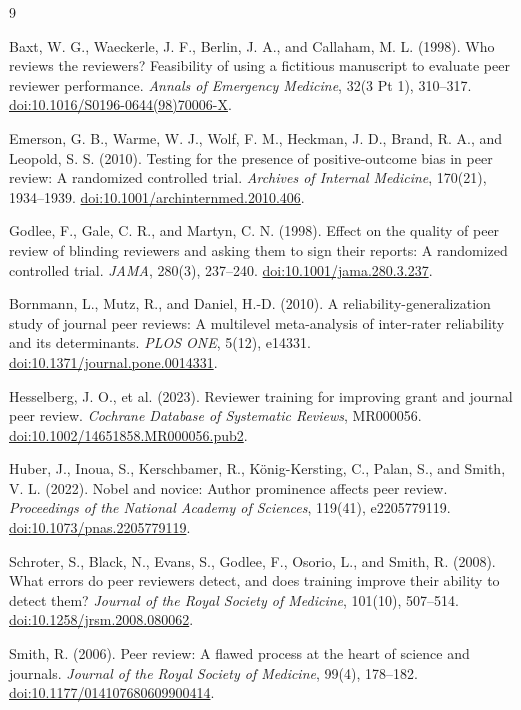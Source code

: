 \begin{thebibliography}{9}


Baxt, W. G., Waeckerle, J. F., Berlin, J. A., and Callaham, M. L. (1998).
Who reviews the reviewers? Feasibility of using a fictitious manuscript to evaluate peer reviewer performance.
\textit{Annals of Emergency Medicine}, 32(3 Pt 1), 310--317.
\href{https://doi.org/10.1016/S0196-0644(98)70006-X}{doi:10.1016/S0196-0644(98)70006-X}.

Emerson, G. B., Warme, W. J., Wolf, F. M., Heckman, J. D., Brand, R. A., and Leopold, S. S. (2010).
Testing for the presence of positive-outcome bias in peer review: A randomized controlled trial.
\textit{Archives of Internal Medicine}, 170(21), 1934--1939.
\href{https://doi.org/10.1001/archinternmed.2010.406}{doi:10.1001/archinternmed.2010.406}.

Godlee, F., Gale, C. R., and Martyn, C. N. (1998).
Effect on the quality of peer review of blinding reviewers and asking them to sign their reports: A randomized controlled trial.
\textit{JAMA}, 280(3), 237--240.
\href{https://doi.org/10.1001/jama.280.3.237}{doi:10.1001/jama.280.3.237}.

Bornmann, L., Mutz, R., and Daniel, H.-D. (2010).
A reliability-generalization study of journal peer reviews: A multilevel meta-analysis of inter-rater reliability and its determinants.
\textit{PLOS ONE}, 5(12), e14331.
\href{https://doi.org/10.1371/journal.pone.0014331}{doi:10.1371/journal.pone.0014331}.

Hesselberg, J. O., et al. (2023).
Reviewer training for improving grant and journal peer review.
\textit{Cochrane Database of Systematic Reviews}, MR000056.
\href{https://doi.org/10.1002/14651858.MR000056.pub2}{doi:10.1002/14651858.MR000056.pub2}.

Huber, J., Inoua, S., Kerschbamer, R., K{\"o}nig-Kersting, C., Palan, S., and Smith, V. L. (2022).
Nobel and novice: Author prominence affects peer review.
\textit{Proceedings of the National Academy of Sciences}, 119(41), e2205779119.
\href{https://doi.org/10.1073/pnas.2205779119}{doi:10.1073/pnas.2205779119}.

Schroter, S., Black, N., Evans, S., Godlee, F., Osorio, L., and Smith, R. (2008).
What errors do peer reviewers detect, and does training improve their ability to detect them?
\textit{Journal of the Royal Society of Medicine}, 101(10), 507--514.
\href{https://doi.org/10.1258/jrsm.2008.080062}{doi:10.1258/jrsm.2008.080062}.

Smith, R. (2006).
Peer review: A flawed process at the heart of science and journals.
\textit{Journal of the Royal Society of Medicine}, 99(4), 178--182.
\href{https://doi.org/10.1177/014107680609900414}{doi:10.1177/014107680609900414}.

\end{thebibliography}

